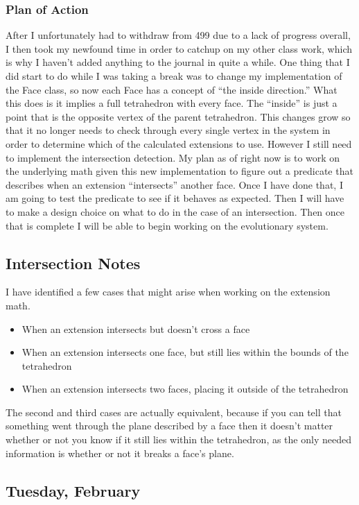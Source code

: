\documentclass[letterpaper,oneside,titlepage]{article}
\begin{document}
\subsubsection{Plan of Action}
After I unfortunately had to withdraw from 499 due to a lack of progress overall, I then took my newfound time in order to catchup on my other class work, which is why I haven't added anything to the journal in quite a while.  One thing that I did start to do while I was taking a break was to change my implementation of the Face class, so now each Face has a concept of ``the inside direction.''  What this does is it implies a full tetrahedron with every face.  The ``inside'' is just a point that is the opposite vertex of the parent tetrahedron.  This changes grow so that it no longer needs to check through every single vertex in the system in order to determine which of the calculated extensions to use.  However I still need to implement the intersection detection.  My plan as of right now is to work on the underlying math given this new implementation to figure out a predicate that describes when an extension ``intersects'' another face.  Once I have done that, I am going to test the predicate to see if it behaves as expected.  Then I will have to make a design choice on what to do in the case of an intersection.  Then once that is complete I will be able to begin working on the evolutionary system.

\subsection{Intersection Notes}
I have identified a few cases that might arise when working on the extension math.
\begin{itemize}
\item When an extension intersects but doesn't cross a face
\item When an extension intersects one face, but still lies within the bounds of the tetrahedron
\item When an extension intersects two faces, placing it outside of the tetrahedron
\end{itemize}
The second and third cases are actually equivalent, because if you can tell that something went through the plane described by a face then it doesn't matter whether or not you know if it still lies within the tetrahedron, as the only needed information is whether or not it breaks a face's plane.

\subsection{Tuesday, February }
\end{document}
